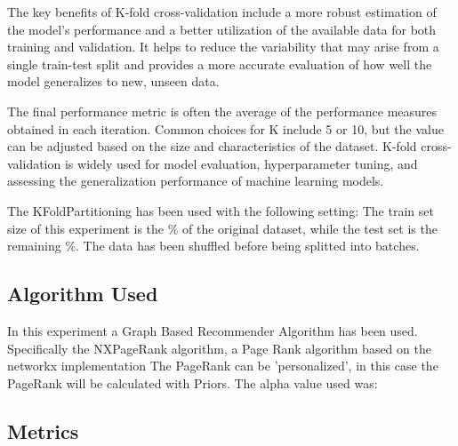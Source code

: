\documentclass[12pt, a4paper]{article}
\begin{document}
The key benefits of K-fold cross-validation include a more robust estimation
of the model's performance and a better utilization of the available data for
both training and validation. It helps to reduce the variability that may arise
from a single train-test split and provides a more accurate evaluation of how
well the model generalizes to new, unseen data.

The final performance metric is often the average of the performance measures
obtained in each iteration. Common choices for K include 5 or 10, but the value
can be adjusted based on the size and characteristics of the dataset. K-fold
cross-validation is widely used for model evaluation, hyperparameter tuning,
and assessing the generalization performance of machine learning models.

The KFoldPartitioning has been used with the following setting:
\hfill\break
\hfill\break
The train set size of this experiment is the \%
of the original dataset, while the test set is the remaining \%.
\hfill\break
\hfill\break
{}
The data has been shuffled before being splitted into batches.



\subsection{Algorithm Used}
In this experiment a Graph Based Recommender Algorithm has been used.
Specifically the NXPageRank algorithm, a Page Rank algorithm based on the networkx implementation
The PageRank can be 'personalized', in this case the PageRank will be calculated with Priors.
The alpha value used was: 




\subsection{Metrics}
\end{document}

